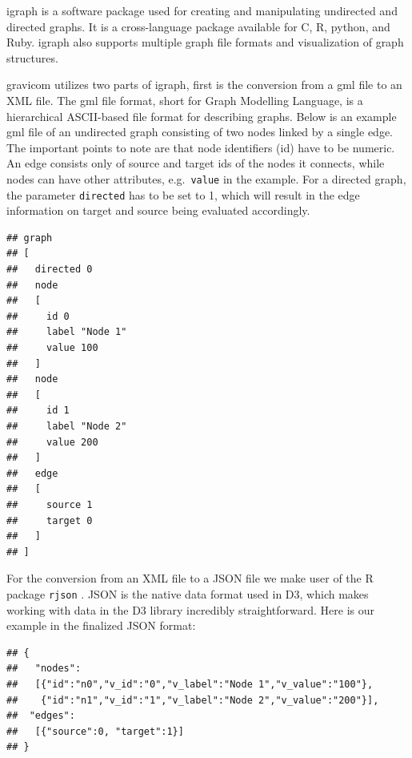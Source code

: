 \documentclass{article}\usepackage[]{graphicx}\usepackage[]{color}
\makeatletter
\newenvironment{kframe}{%
 \def\at@end@of@kframe{}%
 \ifinner\ifhmode%
  \def\at@end@of@kframe{\end{minipage}}%
  \begin{minipage}{\columnwidth}%
 \fi\fi%
 \def\FrameCommand##1{\hskip\@totalleftmargin \hskip-\fboxsep
 \colorbox{shadecolor}{##1}\hskip-\fboxsep
     \hskip-\linewidth \hskip-\@totalleftmargin \hskip\columnwidth}%
 \MakeFramed {\advance\hsize-\width
   \@totalleftmargin\z@ \linewidth\hsize
   \@setminipage}}%
 {\par\unskip\endMakeFramed%
 \at@end@of@kframe}
\newenvironment{knitrout}{}{} %
\makeatother
\begin{document}
igraph \cite{gc-igraph} is a software package used for creating and manipulating undirected and directed graphs. It is a cross-language package available for C, R, python, and Ruby. igraph also supports multiple graph file formats and visualization of graph structures.

gravicom utilizes two parts of igraph, first is the conversion from a gml file to an XML file. The gml file format, short for Graph Modelling Language, is a hierarchical ASCII-based file format for describing graphs. Below is an example gml file of an undirected graph consisting of two nodes linked by a single edge. The important points to note are that  node identifiers (id) have to be numeric. An edge consists only of source and target ids of the nodes it connects, while  nodes can have other attributes, e.g.~{\tt value} in the example. For a directed graph, the parameter {\tt directed} has to be set to 1, which will result in the edge information on target and source being evaluated accordingly.
\begin{knitrout}
\color{fgcolor}\begin{kframe}
\begin{verbatim}
## graph
## [
##   directed 0
##   node
##   [
##     id 0
##     label "Node 1"
##     value 100
##   ]
##   node
##   [
##     id 1
##     label "Node 2"
##     value 200
##   ]
##   edge
##   [
##     source 1
##     target 0
##   ]
## ]
\end{verbatim}
\end{kframe}
\end{knitrout}

For the conversion from an  XML file  to a JSON file we make user of the R package {\tt rjson} \cite{acb-rjson}.  JSON is the native data format used in D3, which  makes working with data in the D3 library incredibly straightforward. Here is our example in the finalized JSON format:
\begin{knitrout}
\color{fgcolor}\begin{kframe}
\begin{verbatim}
## {
##   "nodes":
##   [{"id":"n0","v_id":"0","v_label":"Node 1","v_value":"100"}, 
##    {"id":"n1","v_id":"1","v_label":"Node 2","v_value":"200"}], 
##  "edges":
##   [{"source":0, "target":1}]
## }
\end{verbatim}
\end{kframe}
\end{knitrout}
\end{document}
